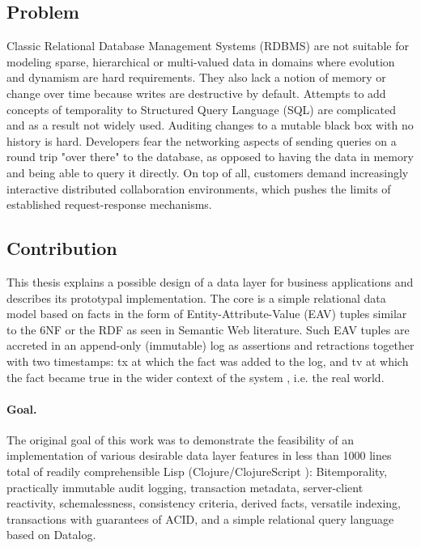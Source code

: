\cleardoublepage

\subsection{Problem}
Classic Relational Database Management Systems (RDBMS) are not suitable for modeling sparse, hierarchical or multi-valued data in domains where evolution and dynamism are hard requirements. They also lack a notion of memory or change over time because writes are destructive by default. Attempts to add concepts of temporality to Structured Query Language (SQL) are complicated and as a result not widely used. Auditing changes to a mutable black box with no history is hard. Developers fear the networking aspects of sending queries on a round trip "over there" \cite{hickey2012dbvalue} to the database, as opposed to having the data in memory and being able to query it directly. On top of all, customers demand increasingly interactive distributed collaboration environments, which pushes the limits of established request-response mechanisms.

\subsection{Contribution}
This thesis explains a possible design of a data layer for business applications and describes its prototypal implementation. The core is a simple relational data model based on facts in the form of Entity-Attribute-Value (EAV) tuples similar to the \gls{6NF} or the \gls{RDF} as seen in Semantic Web literature. Such EAV tuples are accreted in an append-only (immutable) log as assertions and retractions together with two timestamps: \gls{tx} at which the fact was added to the log, and \gls{tv} at which the fact became true in the wider context of the system \cite{snodgrass1992temporal}, i.e. the real world.


\paragraph{Goal.}
The original goal of this work was to demonstrate the feasibility of an implementation of various desirable data layer features in less than 1000 lines total of readily comprehensible Lisp (Clojure/ClojureScript \cite{hickey2008clojure}): Bitemporality, practically immutable audit logging, transaction metadata, server-client reactivity, schemalessness, consistency criteria, derived facts, versatile indexing, transactions with guarantees of \gls{ACID}, and a simple relational query language based on Datalog.

